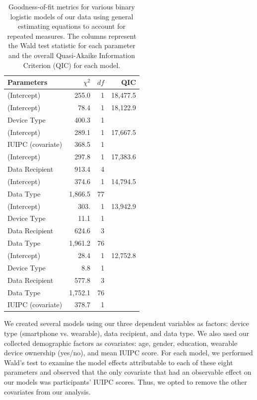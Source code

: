 \documentclass{acm_proc_article-sp}
\begin{document}
\begin{table}
\centering
\begin{tabular}{|l| r| r| r|}
\hline
Parameters & $\chi^2$ & $df$ & QIC\\
\hline
\hline
(Intercept) & 255.0 & 1 & 18,477.5\\
\hline
(Intercept) & 78.4 & 1 & 18,122.9\\
Device Type & 400.3 & 1 & \\
\hline
(Intercept) & 289.1 & 1 & 17,667.5\\
IUIPC (covariate) & 368.5 & 1 & \\
\hline
(Intercept) & 297.8 & 1 &17,383.6\\
Data Recipient & 913.4 & 4 & \\
\hline
(Intercept) & 374.6 & 1 & 14,794.5\\
Data Type & 1,866.5 & 77 & \\
\hline
(Intercept) & 303. & 1 & 13,942.9\\
Device Type & 11.1 & 1 &  \\
Data Recipient & 624.6 & 3 & \\
Data Type & 1,961.2 & 76 &  \\
\hline
(Intercept) & 28.4 & 1 & 12,752.8 \\
Device Type & 8.8 & 1 &  \\
Data Recipient & 577.8 & 3 & \\
Data Type & 1,752.1 & 76 & \\
IUIPC (covariate) & 378.7 & 1 & \\
\hline
\end{tabular}
\caption{Goodness-of-fit metrics for various binary logistic models of our data using general estimating equations to account for repeated measures. The columns represent the Wald test statistic for each parameter and the overall Quasi-Akaike Information Criterion (QIC) for each model.}
\label{regression}
\end{table}

We created several models using our three dependent variables as factors: device type (smartphone vs. wearable), data recipient, and data type. We also used our collected demographic factors as covariates: age, gender, education, wearable device ownership (yes/no), and mean IUIPC score. For each model, we performed Wald's test to examine the model effects attributable to each of these eight parameters and observed that the only covariate that had an observable effect on our models was participants' IUIPC scores. Thus, we opted to remove the other covariates from our analysis.
\end{document}
